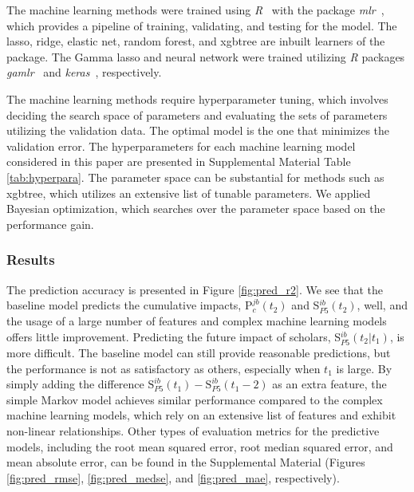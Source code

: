 The machine learning methods were trained using \textit{R}~\cite{RCT2019} with the package \textit{mlr}~\cite{Bischl2016}, which provides a pipeline of training, validating, and testing for the model. The lasso, ridge, elastic net, random forest, and xgbtree are inbuilt learners of the package. The Gamma lasso and neural network were trained utilizing \textit{R} packages \textit{gamlr}~\cite{Taddy2017} and \textit{keras}~\cite{Allaire2019}, respectively. 

The machine learning methods require hyperparameter tuning, which involves deciding the search space of parameters and evaluating the sets of parameters utilizing the validation data. The optimal model is the one that minimizes the validation error. The hyperparameters for each machine learning model considered in this paper are presented in Supplemental Material Table \ref{tab:hyperpara}. The parameter space can be substantial for methods such as xgbtree, which utilizes an extensive list of tunable parameters. We applied Bayesian optimization, which searches over the parameter space based on the performance gain.


\subsubsection*{Results}

The prediction accuracy is presented in Figure \ref{fig:pred_r2}. We see 
that the baseline model predicts the cumulative impacts, P$_c^{jb}(t_2)$ and S$_{P5}^{ib}(t_2)$, well, and the usage of a large number of features and complex machine learning models offers little improvement. Predicting the future impact of scholars, S$_{P5}^{ib}(t_2|t_1)$, is more difficult. The baseline model can still provide reasonable predictions, but the performance is not as satisfactory as others, especially when $t_1$ is large. By simply adding the difference $\text{S}_{P5}^{ib}(t_1) - \text{S}_{P5}^{ib}(t_1-2)$ as an extra feature, the simple Markov model achieves similar performance compared to the complex machine learning models, which rely on an extensive list of features and exhibit non-linear relationships. Other types of evaluation metrics for the predictive models, including the root mean squared error, root median squared error, and mean absolute error, can be found in the Supplemental Material (Figures \ref{fig:pred_rmse}, \ref{fig:pred_medse}, and \ref{fig:pred_mae}, respectively). 

